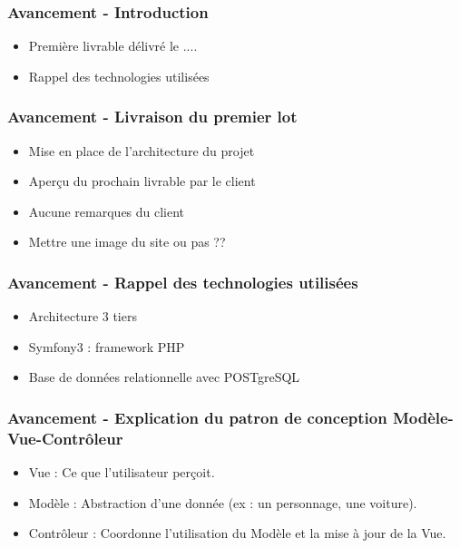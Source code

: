 \speaker{\Kafui}

\begin{frame}
  \frametitle{Avancement - Introduction}
  \begin{itemize}
	\item Première livrable délivré le ....
	\item Rappel des technologies utilisées
  \end{itemize}
\end{frame}

\begin{frame}
  \frametitle{Avancement - Livraison du premier lot}
  \begin{itemize}
	\item Mise en place de l'architecture du projet
	\item Aperçu du prochain livrable par le client
	\item Aucune remarques du client
	\item Mettre une image du site ou pas ??
  \end{itemize}
\end{frame}

\begin{frame}
  \frametitle{Avancement - Rappel des technologies utilisées}
  \begin{itemize}
	\item Architecture 3 tiers
	\item Symfony3 : framework PHP 
	\item Base de données relationnelle avec POSTgreSQL
  \end{itemize}
\end{frame}

\begin{frame}
  \frametitle{Avancement - Explication du patron de conception Modèle-Vue-Contrôleur}
  \begin{itemize}
	\item Vue : Ce que l'utilisateur perçoit.
	\item Modèle : Abstraction d'une donnée (ex : un personnage, une voiture).
	\item Contrôleur : Coordonne l'utilisation du Modèle et la mise à jour de la Vue.
  \end{itemize}
\end{frame}

